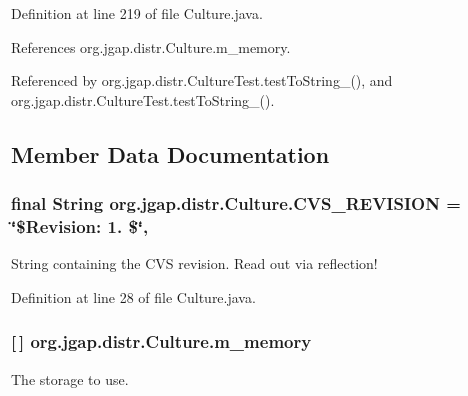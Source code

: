 Definition at line 219 of file Culture.\-java.



References org.\-jgap.\-distr.\-Culture.\-m\-\_\-memory.



Referenced by org.\-jgap.\-distr.\-Culture\-Test.\-test\-To\-String\-\_(), and org.\-jgap.\-distr.\-Culture\-Test.\-test\-To\-String\-\_().



\subsection{Member Data Documentation}
\hypertarget{classorg_1_1jgap_1_1distr_1_1_culture_a1b23418274685cea9eb358967e9f655a}{
\subsubsection[{C\-V\-S\-\_\-\-R\-E\-V\-I\-S\-I\-O\-N}]{\setlength{\rightskip}{0pt plus 5cm}final String org.\-jgap.\-distr.\-Culture.\-C\-V\-S\-\_\-\-R\-E\-V\-I\-S\-I\-O\-N = \char`\"{}\$Revision\-: 1. \$\char`\"{}\hspace{0.3cm}{\ttfamily [static]}, {\ttfamily [private]}}}\label{classorg_1_1jgap_1_1distr_1_1_culture_a1b23418274685cea9eb358967e9f655a}
String containing the C\-V\-S revision. Read out via reflection! 

Definition at line 28 of file Culture.\-java.

\hypertarget{classorg_1_1jgap_1_1distr_1_1_culture_a0d8b40a26aaf1b486f5943613473252d}{
\subsubsection[{m\-\_\-memory}]{ \mbox{[}$\,$\mbox{]} org.\-jgap.\-distr.\-Culture.\-m\-\_\-memory\hspace{0.3cm}{\ttfamily [private]}}}\label{classorg_1_1jgap_1_1distr_1_1_culture_a0d8b40a26aaf1b486f5943613473252d}
The storage to use. 

